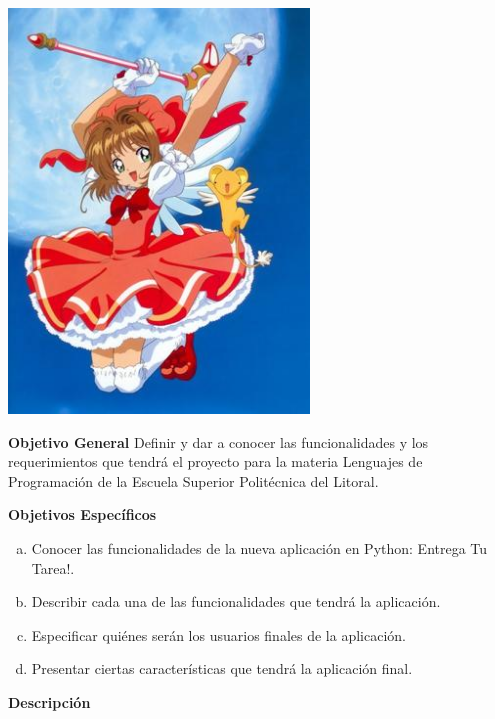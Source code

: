 \documentclass[12pt]{report}
\begin{document}
	\begin{center}
		\begingroup
			\includegraphics[width=0.6\textwidth]{imagenes_usuario/sakura.jpg}
		\endgroup
	\end{center}

	\begingroup
		\large{
			\textbf{
				Objetivo General
				\newline
				\newline
			}
		}
	\endgroup
	Definir y dar a conocer las funcionalidades y los requerimientos que tendrá el proyecto para la materia Lenguajes de 				
	Programación de la Escuela Superior Politécnica del Litoral. 

	\vspace{4em}
	\begingroup
		\large{
			\textbf{
				Objetivos Específicos
				\newline
			}
		}
	\endgroup
		\begin{enumerate}[(a)]%
		\item Conocer las funcionalidades de la nueva aplicación en Python: Entrega Tu Tarea!.
		\item Describir cada una de las funcionalidades que tendrá la aplicación.
		\item Especificar quiénes serán los usuarios finales de la aplicación.
		\item Presentar ciertas características que tendrá la aplicación final.

		\end{enumerate}

	\begingroup
		\large{
			\textbf{
				\newline
				\newline
				\newline
				\newline
				Descripción
				\newline
				\newline
			}
		}
	\endgroup
\end{document}

